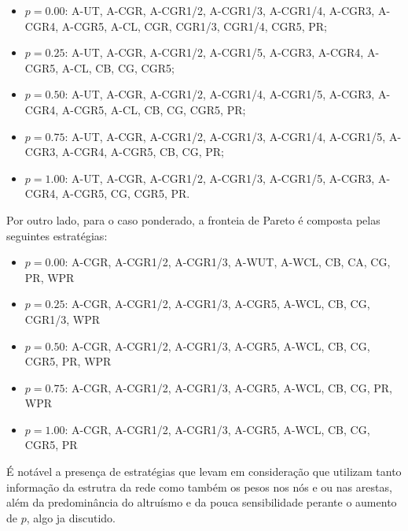\begin{itemize}
    \item \( p = 0.00 \): \gls{A-UT}, A-CGR, A-CGR1/2, A-CGR1/3, A-CGR1/4, A-CGR3, A-CGR4, A-CGR5, A-CL, CGR, CGR1/3, CGR1/4, CGR5, PR;
    \item \( p = 0.25 \): \gls{A-UT}, A-CGR, A-CGR1/2, A-CGR1/5, A-CGR3, A-CGR4, A-CGR5, A-CL, CB, CG, CGR5;
    \item \( p = 0.50 \): \gls{A-UT}, A-CGR, A-CGR1/2, A-CGR1/4, A-CGR1/5, A-CGR3, A-CGR4, A-CGR5, A-CL, CB, CG, CGR5, PR;
    \item \( p = 0.75 \): \gls{A-UT}, A-CGR, A-CGR1/2, A-CGR1/3, A-CGR1/4, A-CGR1/5, A-CGR3, A-CGR4, A-CGR5, CB, CG, PR;
    \item \( p = 1.00 \): \gls{A-UT}, A-CGR, A-CGR1/2, A-CGR1/3, A-CGR1/5, A-CGR3, A-CGR4, A-CGR5, CG, CGR5, PR.
\end{itemize}

Por outro lado, para o caso ponderado, a fronteia de Pareto é composta pelas seguintes estratégias:

\begin{itemize}
    \item \( p = 0.00 \): A-CGR, A-CGR1/2, A-CGR1/3, A-WUT, A-WCL, CB, CA, CG, PR, WPR
    \item \( p = 0.25 \): A-CGR, A-CGR1/2, A-CGR1/3, A-CGR5, A-WCL, CB, CG, CGR1/3, WPR
    \item \( p = 0.50 \): A-CGR, A-CGR1/2, A-CGR1/3, A-CGR5, A-WCL, CB, CG, CGR5, PR, WPR
    \item \( p = 0.75 \): A-CGR, A-CGR1/2, A-CGR1/3, A-CGR5, A-WCL, CB, CG, PR, WPR
    \item \( p = 1.00 \): A-CGR, A-CGR1/2, A-CGR1/3, A-CGR5, A-WCL, CB, CG, CGR5, PR
  \end{itemize}

É notável a presença de estratégias que levam em consideração que utilizam tanto informação da estrutra da rede como também os pesos nos nós e ou nas arestas, além da predominância do altruísmo e da pouca sensibilidade perante o aumento de $p$, algo ja discutido.

